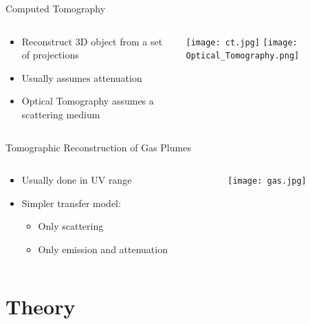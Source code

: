 \documentclass[compress,red,12pt]{beamer}
\begin{document}

\begin{frame}{Computed Tomography}
  \begin{columns}[T]
    \begin{column}{.7\textwidth}
      \begin{itemize}
      \item Reconstruct 3D object from a set of projections
      \item Usually assumes attenuation
      \item Optical Tomography assumes a scattering medium
      \end{itemize}
    \end{column}
    \begin{column}{.3\textwidth}
      \centering
      \texttt{[image: ct.jpg]}
      \texttt{[image: Optical\_Tomography.png]}
    \end{column}
  \end{columns}  
\end{frame}


\begin{frame}[T]{Tomographic Reconstruction of Gas Plumes}
  \begin{columns}[T]
    \begin{column}{.7\textwidth}
      \begin{itemize}
      \item Usually done in UV range
      \item Simpler transfer model:
        \begin{itemize}
        \item Only scattering
        \item Only emission and attenuation
        \end{itemize}
      \end{itemize}
    \end{column}
    \begin{column}{.3\textwidth}
      \texttt{[image: gas.jpg]}
    \end{column}
  \end{columns}    
\end{frame}


\section{Theory}
\end{document}
